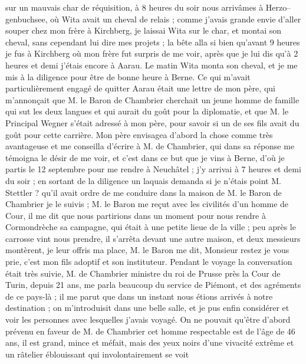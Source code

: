 \documentclass[12pt]{article}
\begin{document}
 sur un mauvais char de réquisition, à 8
heures du soir nous arrivâmes à Herzo–genbuchsee, où Wita avait un cheval de relais ; comme j’avais
grande envie d’aller souper chez mon frère à Kirchberg, je laissai Wita sur le char, et montai son
cheval, sans cependant lui dire mes projets ; la bête alla si bien qu’avant 9 heures je fus à
Kirchberg où mon frère fut surpris de me voir, après que je lui dis qu’à 2 heures et demi j’étais
encore à Aarau. Le matin Wita monta son cheval, et je me mis à la diligence pour être de bonne heure
à Berne. Ce qui m’avait particulièrement engagé de quitter Aarau était une lettre de mon père, qui
m’annonçait que M. le Baron de Chambrier cherchait un jeune homme de famille qui sut les deux
langues et qui aurait du goût pour la diplomatie, et que M. le Principal Wegner s’était adressé à
mon père, pour savoir si un de ses fils avait du goût pour cette carrière. Mon père envisagea
d’abord la chose comme très avantageuse et me conseilla d’écrire à M. de Chambrier, qui dans sa
réponse me témoigna le désir de me voir, et c’est dans ce but que je vins à Berne, d’où je partis le
12 septembre pour me rendre à Neuchâtel ; j’y arrivai à 7 heures et demi du soir ; en sortant de la
diligence un laquais demanda si je n’étais point M. Stettler ? qu’il avait ordre de me conduire dans
la maison de M. le Baron de Chambrier je le suivis ; M. le Baron me reçut avec les civilités d’un
homme de Cour, il me dit que nous partirions dans un moment pour nous rendre à Cormondrèche sa
campagne, qui était à une petite lieue de la ville ; peu après le carrosse vint nous prendre, il
s’arrêta devant une autre maison, et deux messieurs montèrent, je leur offris ma place, M. le Baron
me dit, Monsieur restez je vous prie, c’est mon fils adoptif et son instituteur. Pendant le voyage
la conversation était très suivie, M. de Chambrier ministre du roi de Prusse près la Cour de Turin,
depuis 21 ans, me parla beaucoup du service de Piémont, et des agréments de ce pays-là ; il me parut
que dans un instant nous étions arrivés à notre destination ; on m’introduisit dans une belle salle,
et je pus enfin considérer et voir les personnes avec lesquelles j’avais voyagé. On ne pouvait
qu’être d’abord prévenu en faveur de M. de Chambrier cet homme respectable est de l’âge de 46 ans,
il est grand, mince et méfait, mais des yeux noirs d’une vivacité extrême et un râtelier éblouissant
qui involontairement se voit
\end{document}
